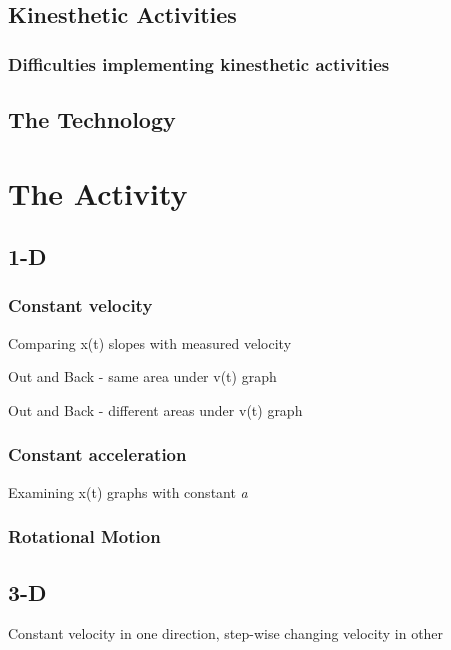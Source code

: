 \documentclass[prb,preprint]{revtex4-1}
\begin{document}
\subsection{Kinesthetic Activities}

\subsubsection{Difficulties implementing kinesthetic activities}



\subsection{The Technology}

\section{The Activity}

\subsection{1-D}

\subsubsection{Constant velocity}

Comparing x(t) slopes with measured velocity

Out and Back - same area under v(t) graph

Out and Back - different areas under v(t) graph

\subsubsection{Constant acceleration}

Examining x(t) graphs with constant {\it a}

\subsubsection{Rotational Motion}


\subsection{3-D}

Constant velocity in one direction, step-wise changing velocity in other
\end{document}
